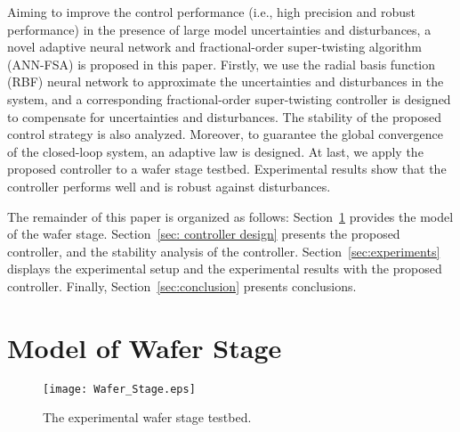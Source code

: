 \documentclass{ifacconf}
\begin{document}
Aiming to improve the control performance (i.e., high precision and robust performance) in the presence of large model uncertainties and disturbances, a novel adaptive neural network and fractional-order super-twisting algorithm (ANN-FSA) is proposed in this paper. Firstly, we use the radial basis function (RBF) neural network to approximate the uncertainties and disturbances in the system, and a corresponding fractional-order super-twisting controller is designed to compensate for uncertainties and disturbances. The stability of the proposed control strategy is also analyzed. Moreover, to guarantee the global convergence of the closed-loop system, an adaptive law is designed. At last, we apply the proposed controller to a wafer stage testbed. Experimental results show that the controller performs well and is robust against disturbances.

The remainder of this paper is organized as follows: Section~\ref{sec: system_model} provides the model of the wafer stage. Section~\ref{sec: controller design} presents the proposed controller, and the stability analysis of the controller. Section~\ref{sec:experiments} displays the experimental setup and the experimental results with the proposed controller. Finally, Section~\ref{sec:conclusion} presents conclusions.

\section{Model of Wafer Stage}\label{sec: system_model}


\begin{figure}[http]
  \centering
   \texttt{[image: Wafer\_Stage.eps]}%
   \caption{The experimental wafer stage testbed.}
   \label{fig:wafer_stage}
   \end{figure}
   
\end{document}
